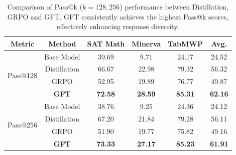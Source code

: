 

\begin{table}[!t]
    \centering
    \footnotesize
    \caption{Comparison of Pass@k ($k=128, 256$) performance between Distillation, GRPO and GFT. GFT consistently achieves the highest Pass@k scores, effectively enhancing response diversity.}
    \label{tab:passk}
    
    \begin{minipage}{0.5\linewidth}
    \centering
    \setlength{\tabcolsep}{2pt}
    \renewcommand{\arraystretch}{1.2}
    
    \begin{tabular*}{\linewidth}{@{\extracolsep{\fill}}c|c|cccc}
        \toprule
        \textbf{Metric} & \textbf{Method} & \textbf{SAT Math} & \textbf{Minerva} & \textbf{TabMWP} & \textbf{Avg.} \\
        \midrule
        \multirow{4}{*}{Pass@128} 
        & Base Model   & 39.69 & 9.71  & 24.17 & 24.52 \\
        & Distillation & 66.67 & 22.98 & 79.32 & 56.32 \\
        & GRPO         & 52.95 & 19.89 & 76.77 & 49.87 \\
        & \textbf{GFT} & \textbf{72.58} & \textbf{28.59} & \textbf{85.31} & \textbf{62.16} \\
        \midrule
        \multirow{4}{*}{Pass@256} 
        & Base Model   & 38.76 & 9.25  & 24.36 & 24.12 \\
         & Distillation & 67.20 & 21.84 & 79.28 & 56.11 \\
          & GRPO         & 51.90 & 19.77 & 75.82 & 49.16 \\
          & \textbf{GFT} & \textbf{73.33} & \textbf{27.17} & \textbf{85.23} & \textbf{61.91} \\
          \bottomrule
    \end{tabular*}
    \end{minipage}
\end{table}

